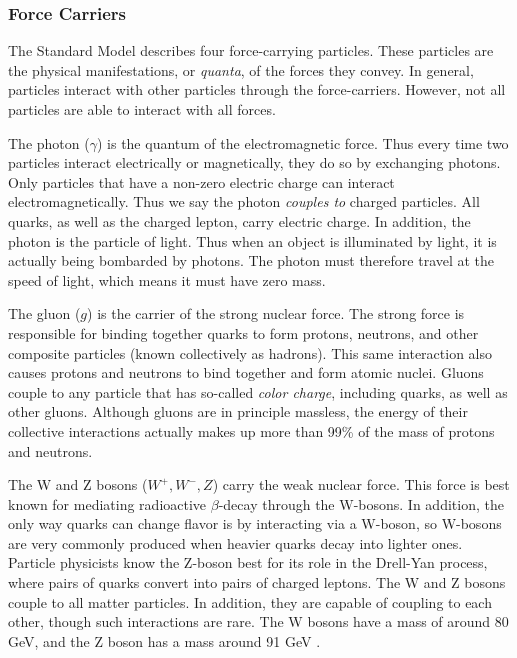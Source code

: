 \subsubsection*{Force Carriers}
The Standard Model describes four force-carrying particles. These
particles are the physical manifestations, or \emph{quanta}, of the forces
they convey. In general, particles interact with other particles through the
force-carriers. However, not all particles are able to interact with
all forces.

The photon ($\gamma$) is the quantum of the electromagnetic
force. Thus every time two particles interact electrically or
magnetically, they do so by exchanging photons. Only particles that
have a non-zero electric charge can interact electromagnetically. Thus
we say the photon \emph{couples to} charged particles. All quarks, as
well as the charged lepton, carry electric charge. In addition, the
photon is the particle of light. Thus when an object is illuminated by
light, it is actually being bombarded by photons. The photon must
therefore travel at the speed of light, which means it must have zero
mass.

The gluon ($g$) is the carrier of the strong nuclear force. The strong
force is responsible for binding together quarks to form protons,
neutrons, and other composite particles (known collectively as
hadrons). This same interaction also causes protons and neutrons to
bind together and form atomic nuclei. Gluons couple to any particle
that has so-called \emph{color charge}, including quarks, as well as
other gluons. Although gluons are in principle massless, the energy of
their collective interactions actually makes up more than 99\% of the
mass of protons and neutrons.

The W and Z bosons ($W^+, W^-, Z$) carry the weak nuclear force. This
force is best known for mediating radioactive $\beta$-decay through
the W-bosons. In addition, the only way quarks can change flavor is by
interacting via a W-boson, so W-bosons are very commonly produced when
heavier quarks decay into lighter ones.
Particle physicists know the Z-boson best for its
role in the Drell-Yan process, where pairs of quarks convert into
pairs of charged leptons. The W and Z bosons couple to all matter
particles. In addition, they are capable of coupling to each other,
though such interactions are rare. The W bosons have a mass of around
80 GeV, and the Z boson has a mass around 91 GeV \cite{pdg}.

